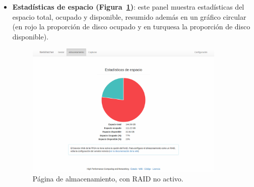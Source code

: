 \begin{itemize}
\item \textbf{Estadísticas de espacio (Figura~\ref{fig:captura:espacio})}: este panel muestra estadísticas del espacio total, ocupado y disponible, resumido además en un gráfico circular (en rojo la proporción de disco ocupado y en turquesa la proporción de disco disponible).
\begin{figure}[!htp]
  \centering
  \includegraphics[width=0.9\textwidth,clip=true]{graphics/capturas/almacenamiento_espacio}
  \caption{Página de almacenamiento, con \gls{RAID} no activo.}
  \label{fig:captura:espacio}
\end{figure}


\end{itemize}
